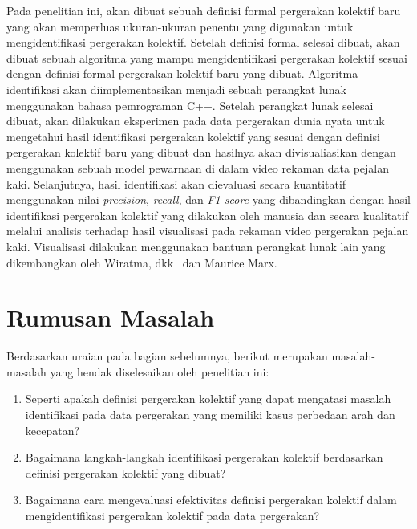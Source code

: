 Pada penelitian ini, akan dibuat sebuah definisi formal pergerakan kolektif baru yang akan memperluas ukuran-ukuran penentu yang digunakan untuk mengidentifikasi pergerakan kolektif. Setelah definisi formal selesai dibuat, akan dibuat sebuah algoritma yang mampu mengidentifikasi pergerakan kolektif sesuai dengan definisi formal pergerakan kolektif baru yang dibuat. Algoritma identifikasi akan diimplementasikan menjadi sebuah perangkat lunak menggunakan bahasa pemrograman C++. Setelah perangkat lunak selesai dibuat, akan dilakukan eksperimen pada data pergerakan dunia nyata untuk mengetahui hasil identifikasi pergerakan kolektif yang sesuai dengan definisi pergerakan kolektif baru yang dibuat dan hasilnya akan divisualiasikan dengan menggunakan sebuah model pewarnaan di dalam video rekaman data pejalan kaki. Selanjutnya, hasil identifikasi akan dievaluasi secara kuantitatif menggunakan nilai \textit{precision}, \textit{recall}, dan \textit{F1 score} yang dibandingkan dengan hasil identifikasi pergerakan kolektif yang dilakukan oleh manusia dan secara kualitatif melalui analisis terhadap hasil visualisasi pada rekaman video pergerakan pejalan kaki. Visualisasi dilakukan menggunakan bantuan perangkat lunak lain yang dikembangkan oleh Wiratma, dkk~\cite{wiratma:software} dan Maurice Marx\footnotemark[9].


\section{Rumusan Masalah}
\label{sec:rumusan}

Berdasarkan uraian pada bagian sebelumnya, berikut merupakan masalah-masalah yang hendak diselesaikan oleh penelitian ini:
\iffalse

\lionov{masalah pertama itu ukuran apa saja yang bisa digunakan, kedua bagaimana membuat model pergerakan kolektif yang memanfaatkan ukuran lintasan, yang ketiga bagaimana membuat algoritmanya. Soalnya yang poin 2 dan 3 kan gak dilakukan, elu gak ngebahas berbagai definisi formal, ukuran, teknik, dan algoritma (karena pertanyaannya ``apa aja''}

\fi
\begin{enumerate}
    \item Seperti apakah definisi pergerakan kolektif yang dapat mengatasi masalah identifikasi pada data pergerakan yang memiliki kasus perbedaan arah dan kecepatan? 
    \item Bagaimana langkah-langkah identifikasi pergerakan kolektif berdasarkan definisi pergerakan kolektif yang dibuat?  
    \item Bagaimana cara mengevaluasi efektivitas definisi pergerakan kolektif dalam mengidentifikasi pergerakan kolektif pada data pergerakan?
\end{enumerate}

